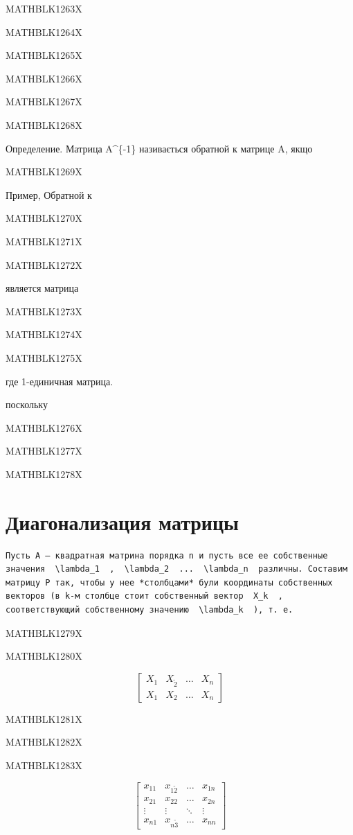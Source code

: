\documentclass[
  ukrainian,
]{article}
\begin{document}
MATHBLK1263X

MATHBLK1264X

MATHBLK1265X

MATHBLK1266X

MATHBLK1267X

MATHBLK1268X

Определение. Матрица A\^{}\{-1\} називається обратной к матрице A, якщо

MATHBLK1269X

Пример, Обратной к

MATHBLK1270X

MATHBLK1271X

MATHBLK1272X

является матрица

MATHBLK1273X

MATHBLK1274X

MATHBLK1275X

где 1-единичная матрица.

поскольку

MATHBLK1276X

MATHBLK1277X

MATHBLK1278X

\section{Диагонализация
матрицы}\label{ux434ux438ux430ux433ux43eux43dux430ux43bux438ux437ux430ux446ux438ux44f-ux43cux430ux442ux440ux438ux446ux44b}

\begin{verbatim}
Пусть A — квадратная матрина порядка n и пусть все ее собственные значения  \lambda_1  ,  \lambda_2  ...  \lambda_n  различны. Составим матрицу P так, чтобы у нее *столбцами* були координаты собственных векторов (в k-м столбце стоит собственный вектор  X_k  , соответствующий собственному значению  \lambda_k  ), т. е.
\end{verbatim}

MATHBLK1279X

MATHBLK1280X

\[
\begin{bmatrix} X_1 & X_{\tilde{2}} & \dots & X_n \\ X_{1} & X_{2} & \dots & X_n \end{bmatrix}
\]

MATHBLK1281X

MATHBLK1282X

MATHBLK1283X

\[
\begin{bmatrix} x_{11} & x_{1\tilde{2}} & \dots & x_{1n} \\ x_{21} & x_{22} & \dots & x_{2n} \\ \vdots & \vdots & \ddots & \vdots \\ x_{n1} & x_{n\tilde{3}} & \dots & x_{nn} \end{bmatrix}
\]
\end{document}
